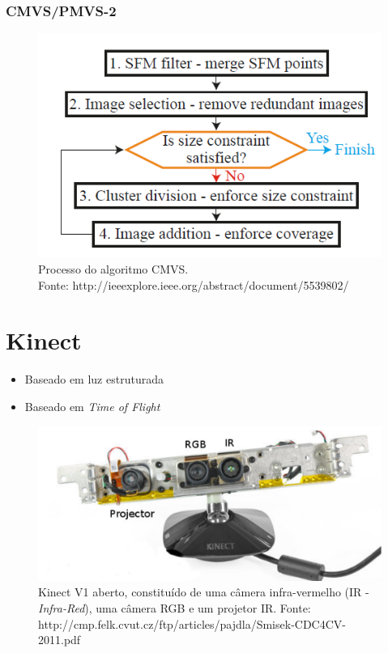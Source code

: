 \documentclass[table, usenames, svgnames, xcolor=dvipsnames]{beamer}
\begin{document}
\begin{frame} 
\frametitle{\textbf{CMVS/PMVS-2}}
	\begin{center}
		\begin{figure}
			\includegraphics[width=0.6\linewidth]{figs/cmvspipe.png}
			\caption{Processo do algoritmo CMVS. \\
			\tiny{Fonte: http://ieeexplore.ieee.org/abstract/document/5539802/}
			}
		\end{figure}
	\end{center}
\end{frame}

\section{Kinect}

\begin{frame}
	\begin{itemize}
		\item {Baseado em luz estruturada}
		\item {Baseado em \emph{Time of Flight}}
	\end{itemize}
\end{frame}

\begin{frame}
	\begin{figure}
		\centering
		\includegraphics[width=0.5\linewidth]{figs/kinect.png}
		\caption{%
 		 Kinect V1 aberto, constituído de uma câmera infra-vermelho (IR -
 		 \emph{Infra-Red}), uma câmera RGB e um projetor IR.
 		 \tiny{Fonte: http://cmp.felk.cvut.cz/ftp/articles/pajdla/Smisek-CDC4CV-2011.pdf}
		}
	\end{figure}
\end{frame}
\end{document}
